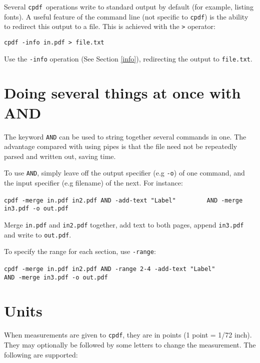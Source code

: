 \documentclass{book}
\newcommand{\cpdf}{\texttt{cpdf}}
\begin{document}
Several \cpdf\ operations write to standard output by default (for
example, listing fonts). A useful feature of the command line (not specific to
\cpdf) is the ability to redirect this output to a file. This is
achieved with the \texttt{>} operator:

\begin{framed}
  \small\verb!cpdf -info in.pdf > file.txt!

  \vspace{2.5mm}
  \noindent Use the \texttt{-info} operation (See Section \ref{info}), redirecting the
output to \texttt{file.txt}.
\end{framed}

\section{Doing several things at once with AND}

The keyword \texttt{AND} can be used to string together several commands in
one. The advantage compared with using pipes is that the file need not be
repeatedly parsed and written out, saving time.

To use \texttt{AND}, simply leave off the output specifier (e.g \texttt{-o}) of
one command, and the input specifier (e.g filename) of the next. For instance:

\begin{framed}
  \small\verb!cpdf -merge in.pdf in2.pdf AND -add-text "Label"!
  \noindent\small\verb!        AND -merge in3.pdf -o out.pdf!

  \vspace{2.5mm}
  \noindent Merge \texttt{in.pdf} and \texttt{in2.pdf} together, add text to both pages, append \texttt{in3.pdf} and write to \texttt{out.pdf}.
\end{framed}

\noindent To specify the range for each section, use \texttt{-range}:

\begin{framed}
  \small\verb!cpdf -merge in.pdf in2.pdf AND -range 2-4 -add-text "Label"!
  \noindent\small\verb!        AND -merge in3.pdf -o out.pdf!

\end{framed}

\section{Units}
When measurements are given to \cpdf, they are in points (1 point = 1/72 inch). They may optionally
be followed by some letters to change the measurement. The following are
supported:
\end{document}
